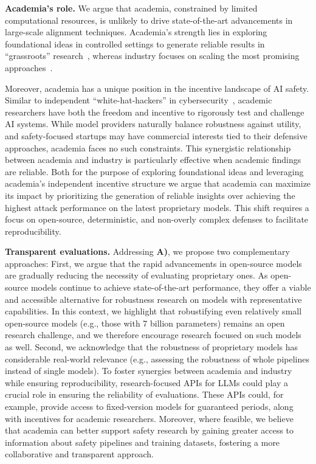 \textbf{Academia's role.} %
We argue that academia, constrained by limited computational resources, is unlikely to drive state-of-the-art advancements in large-scale alignment techniques. 
Academia's strength lies in exploring foundational ideas in controlled settings to generate reliable results in ``grassroots'' research~\cite{krizhevsky2012imagenet, vaswani2017attention}, whereas industry focuses on scaling the most promising approaches~\cite{brown2020language}. 

Moreover, academia has a unique position in the incentive landscape of AI safety. Similar to independent ``white-hat-hackers'' in cybersecurity~\cite{caldwell2011ethical}, academic researchers have both the freedom and incentive to rigorously test and challenge AI systems. While model providers naturally balance robustness against utility, and safety-focused startups may have commercial interests tied to their defensive approaches, academia faces no such constraints. This synergistic relationship between academia and industry is particularly effective when academic findings are reliable. Both for the purpose of exploring foundational ideas and leveraging academia's independent incentive structure we argue that academia can maximize its impact by prioritizing the generation of reliable insights over achieving the highest attack performance on the latest proprietary models. This shift requires a focus on open-source, deterministic, and non-overly complex defenses to facilitate reproducibility. %

\textbf{Transparent evaluations.} Addressing \textbf{A)}, we propose two complementary approaches: First, we argue that the rapid advancements in open-source models are gradually reducing the necessity of evaluating proprietary ones. As open-source models continue to achieve state-of-the-art performance, they offer a viable and accessible alternative for robustness research on models with representative capabilities.
In this context, we highlight that robustifying even relatively small open-source models (e.g., those with 7 billion parameters) remains an open research challenge, and we therefore encourage research focused on such models as well. Second, we acknowledge that the robustness of proprietary models has considerable real-world relevance (e.g., assessing the robustness of whole pipelines instead of single models). To foster synergies between academia and industry while ensuring reproducibility, research-focused APIs for LLMs could play a crucial role in ensuring the reliability of evaluations. These APIs could, for example, provide access to fixed-version models for guaranteed periods, along with incentives for academic researchers. Moreover, where feasible, we believe that academia can better support safety research by gaining greater access to information about safety pipelines and training datasets, fostering a more collaborative and transparent approach.

